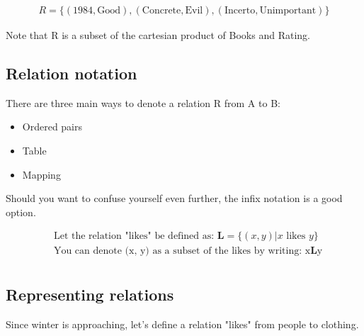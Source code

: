 \documentclass{article}
\begin{document}
\begin{align*}
    R = \{(1984, \text{Good}), (\text{Concrete}, \text{Evil}), (\text{Incerto}, \text{Unimportant})\}
\end{align*}

Note that R is a subset of the cartesian product of Books and Rating.

\subsection{Relation notation}

There are three main ways to denote a relation R from A to B:

\begin{itemize}
    \item Ordered pairs
    \item Table
    \item Mapping
\end{itemize}

Should you want to confuse yourself even further, the infix notation is a good option.

\begin{align*}
     & \text{Let the relation "likes" be defined as: } \mathbf{L} = \{(x, y) | x \text{ likes } y\} \\
     & \text{You can denote (x, y) as a subset of the likes by writing: x$\mathbf{L}$y}             \\
\end{align*}

\subsection{Representing relations}

Since winter is approaching, let's define a relation "likes" from people to clothing.
\end{document}
